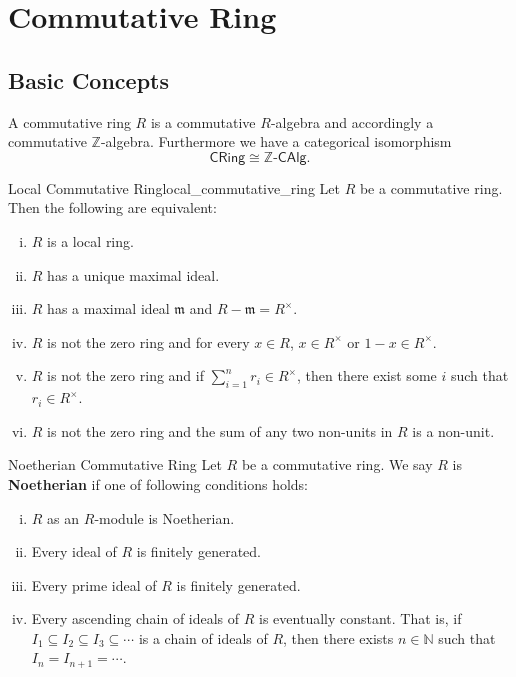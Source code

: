 \chapter{Commutative Ring}
\section{Basic Concepts}
A commutative ring $R$ is a commutative $R$-algebra and accordingly a commutative $\mathbb{Z}$-algebra. Furthermore we have a categorical isomorphism 
\[
    \mathsf{CRing}\cong \mathbb{Z}\text{-}\mathsf{CAlg}.
\]
\begin{definition}{Local Commutative Ring}{local_commutative_ring}
    Let $R$ be a commutative ring. Then the following are equivalent:
    \begin{enumerate}[(i)]
        \item $R$ is a local ring.
        \item $R$ has a unique maximal ideal.
        \item $R$ has a maximal ideal $\mathfrak{m}$ and $R - \mathfrak{m}= R^{\times}$.
        \item $R$ is not the zero ring and for every $x \in R$, $x\in R^{\times}$ or $1-x\in R^{\times}$.
        \item $R$ is not the zero ring and if $\sum_{i=1}^n r_i\in R^{\times}$, then there exist some $i$ such that $r_i\in R^{\times}$. 
        \item $R$ is not the zero ring and the sum of any two non-units in $R$ is a non-unit.
    \end{enumerate}
\end{definition}


\begin{definition}{Noetherian Commutative Ring}{}
    Let $R$ be a commutative ring. We say $R$ is \textbf{Noetherian} if one of following conditions holds:
    \begin{enumerate}[(i)]
        \item $R$ as an $R$-module is Noetherian.
        \item Every ideal of $R$ is finitely generated.
        \item Every prime ideal of $R$ is finitely generated.
        \item Every ascending chain of ideals of $R$ is eventually constant. That is, if $I_1\subseteq I_2\subseteq I_3\subseteq\cdots$ is a chain of ideals of $R$, then there exists $n\in\mathbb{N}$ such that $I_n=I_{n+1}=\cdots$.
    \end{enumerate}
\end{definition}

